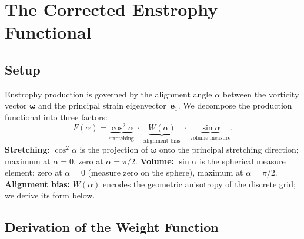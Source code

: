 \documentclass[11pt,a4paper]{article}
\begin{document}
\section{The Corrected Enstrophy Functional}

\subsection{Setup}

Enstrophy production is governed by the alignment angle $\alpha$ between the vorticity vector $\bm{\omega}$ and the principal strain eigenvector~$\bm{e}_1$. We decompose the production functional into three factors:
\begin{equation}\label{eq:F}
  F(\alpha) = \underbrace{\cos^2\alpha}_{\text{stretching}}
              \;\cdot\; \underbrace{W(\alpha)}_{\text{alignment bias}}
              \;\cdot\; \underbrace{\sin\alpha}_{\text{volume measure}}.
\end{equation}
\textbf{Stretching:} $\cos^2\alpha$ is the projection of $\bm{\omega}$ onto the principal stretching direction; maximum at $\alpha=0$, zero at $\alpha=\pi/2$. \textbf{Volume:} $\sin\alpha$ is the spherical measure element; zero at $\alpha=0$ (measure zero on the sphere), maximum at $\alpha=\pi/2$. \textbf{Alignment bias:} $W(\alpha)$ encodes the geometric anisotropy of the discrete grid; we derive its form below.

\subsection{Derivation of the Weight Function}
\end{document}
